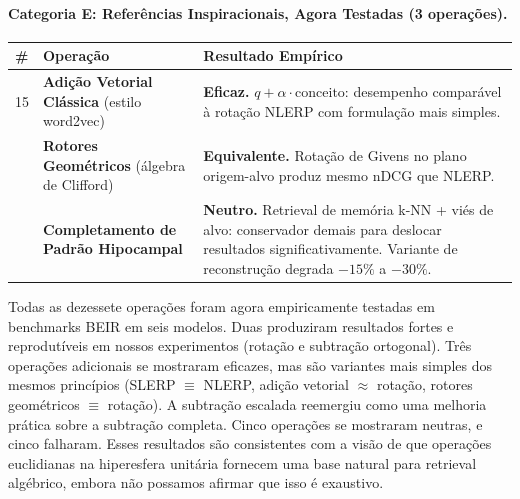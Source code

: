 \documentclass{article}
\begin{document}
\paragraph{Categoria E: Referências Inspiracionais, Agora Testadas (3 operações).}

\begin{longtable}{>{\raggedright}p{0.3cm} >{\raggedright}p{3.5cm} p{9.5cm}}
\toprule
\# & Operação & Resultado Empírico \\
\midrule
\endhead
15 & \textbf{Adição Vetorial Clássica} (estilo word2vec) & \textbf{Eficaz.} $q + \alpha \cdot \text{conceito}$: desempenho comparável à rotação NLERP com formulação mais simples. \\
\addlinespace
16 & \textbf{Rotores Geométricos} (álgebra de Clifford) & \textbf{Equivalente.} Rotação de Givens no plano origem-alvo produz mesmo nDCG que NLERP. \\
\addlinespace
17 & \textbf{Completamento de Padrão Hipocampal} & \textbf{Neutro.} Retrieval de memória k-NN + viés de alvo: conservador demais para deslocar resultados significativamente. Variante de reconstrução degrada $-15\%$ a $-30\%$. \\
\bottomrule
\end{longtable}

Todas as dezessete operações foram agora empiricamente testadas em benchmarks BEIR em seis modelos. Duas produziram resultados fortes e reprodutíveis em nossos experimentos (rotação e subtração ortogonal). Três operações adicionais se mostraram eficazes, mas são variantes mais simples dos mesmos princípios (SLERP $\equiv$ NLERP, adição vetorial $\approx$ rotação, rotores geométricos $\equiv$ rotação). A subtração escalada reemergiu como uma melhoria prática sobre a subtração completa. Cinco operações se mostraram neutras, e cinco falharam. Esses resultados são consistentes com a visão de que operações euclidianas na hiperesfera unitária fornecem uma base natural para retrieval algébrico, embora não possamos afirmar que isso é exaustivo.
\end{document}

